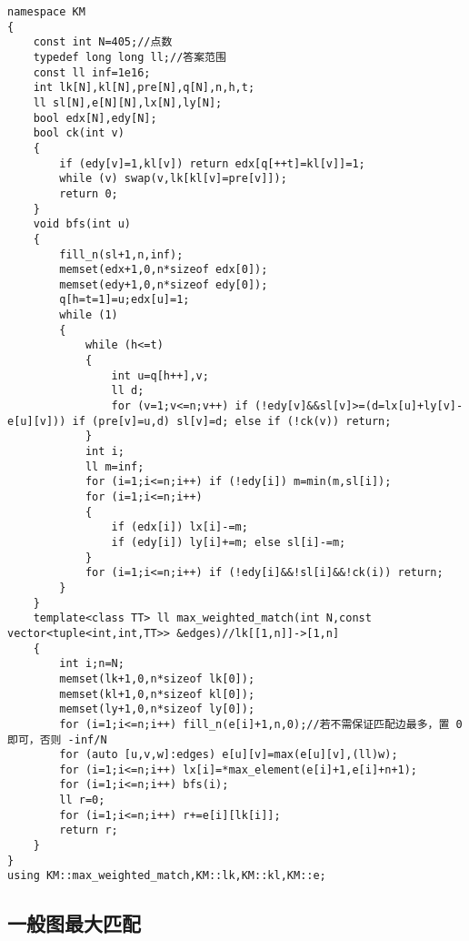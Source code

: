 \documentclass[12pt]{ctexart}
\begin{document}
\begin{lstlisting}
namespace KM
{
	const int N=405;//点数
	typedef long long ll;//答案范围
	const ll inf=1e16;
	int lk[N],kl[N],pre[N],q[N],n,h,t;
	ll sl[N],e[N][N],lx[N],ly[N];
	bool edx[N],edy[N];
	bool ck(int v)
	{
		if (edy[v]=1,kl[v]) return edx[q[++t]=kl[v]]=1;
		while (v) swap(v,lk[kl[v]=pre[v]]);
		return 0;
	}
	void bfs(int u)
	{
		fill_n(sl+1,n,inf);
		memset(edx+1,0,n*sizeof edx[0]);
		memset(edy+1,0,n*sizeof edy[0]);
		q[h=t=1]=u;edx[u]=1;
		while (1)
		{
			while (h<=t)
			{
				int u=q[h++],v;
				ll d;
				for (v=1;v<=n;v++) if (!edy[v]&&sl[v]>=(d=lx[u]+ly[v]-e[u][v])) if (pre[v]=u,d) sl[v]=d; else if (!ck(v)) return;
			}
			int i;
			ll m=inf;
			for (i=1;i<=n;i++) if (!edy[i]) m=min(m,sl[i]);
			for (i=1;i<=n;i++)
			{
				if (edx[i]) lx[i]-=m;
				if (edy[i]) ly[i]+=m; else sl[i]-=m;
			}
			for (i=1;i<=n;i++) if (!edy[i]&&!sl[i]&&!ck(i)) return;
		}
	}
	template<class TT> ll max_weighted_match(int N,const vector<tuple<int,int,TT>> &edges)//lk[[1,n]]->[1,n]
	{
		int i;n=N;
		memset(lk+1,0,n*sizeof lk[0]);
		memset(kl+1,0,n*sizeof kl[0]);
		memset(ly+1,0,n*sizeof ly[0]);
		for (i=1;i<=n;i++) fill_n(e[i]+1,n,0);//若不需保证匹配边最多，置 0 即可，否则 -inf/N
		for (auto [u,v,w]:edges) e[u][v]=max(e[u][v],(ll)w);
		for (i=1;i<=n;i++) lx[i]=*max_element(e[i]+1,e[i]+n+1);
		for (i=1;i<=n;i++) bfs(i);
		ll r=0;
		for (i=1;i<=n;i++) r+=e[i][lk[i]];
		return r;
	}
}
using KM::max_weighted_match,KM::lk,KM::kl,KM::e;
\end{lstlisting}

\subsection{一般图最大匹配}
\end{document}

